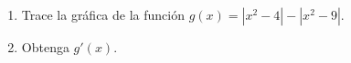 \item \par
\begin{enumerate}
    \item[(a)] Trace la gráfica de la función $g(x) = |x^2 - 4| - |x^2 - 9|$.
    \item[(b)] Obtenga $g'(x)$.
\end{enumerate}
